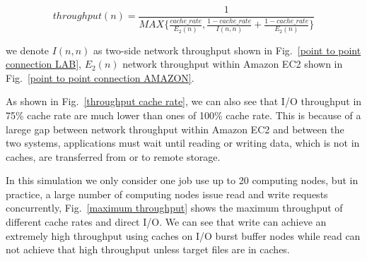 \[throughput(n)=\frac{1}{MAX\{\frac{{cache\_rate}}{E_2(n)},\frac{1-cache\_rate}{I(n,n)}+\frac{1-cache\_rate}{E_2(n)}\}}\]

we denote $I(n,n)$ as two-side network throughput shown in Fig.~\ref{point to point connection LAB}, 
$E_2(n)$ network throughput within Amazon EC2 shown in Fig.~\ref{point to point connection AMAZON}.

As shown in Fig.~\ref{throughput cache rate}, we can also see that I/O throughput in 75\% cache rate are much lower than ones of 100\% cache rate.
This is because of a larege gap between network throughput within Amazon EC2 and between the two systems, 
applications must wait until reading or writing data, which is not in caches, are transferred from or to remote storage.

In this simulation we only consider one job use up to 20 computing nodes, but in practice, a large number of computing nodes issue read and write requests concurrently, 
Fig.~\ref{maximum throughput} shows the maximum throughput of different cache rates and direct I/O.
We can see that write can achieve an extremely high throughput using caches on I/O burst buffer nodes while read can not achieve that high throughput unless target files are in caches.


